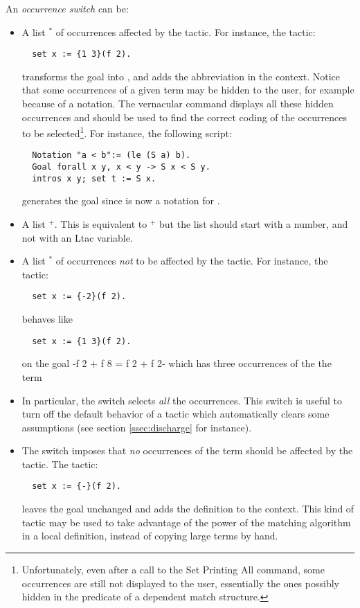 An \emph{occurrence switch} can be:
\begin{itemize}
\item A list \ssrC{\{} {\naturalnumber}$^*$ \ssrC{\}} of occurrences affected by the
  tactic.
For instance, the tactic:
\begin{lstlisting}
  set x := {1 3}(f 2).
\end{lstlisting}
transforms the goal  into
, and adds the abbreviation
 in the
context. Notice that some occurrences of a
given term may be hidden to the user, for example because of a
notation. The vernacular  command displays all
these hidden occurrences and should be used to find the correct
coding of the occurrences to be selected\footnote{Unfortunately,
even after a call to the Set Printing All command, some occurrences are
still not displayed to the user, essentially the ones possibly hidden
in the predicate of a dependent match structure.}. For instance, the
following script:
\begin{lstlisting}
  Notation "a < b":= (le (S a) b).
  Goal forall x y, x < y -> S x < S y.
  intros x y; set t := S x.
\end{lstlisting}
generates the goal
 since  is now a notation for
.
\item A list \ssrC{\{}{\naturalnumber}$^+$\ssrC{\}}. This is equivalent to
  \ssrC{\{} {\naturalnumber}$^+$ \ssrC{\}} but the list should start with a number, and
  not with an Ltac variable.
\item A list \ssrC{\{}{\naturalnumber}$^*$\ssrC{\}} of occurrences \emph{not} to be
  affected by the tactic. For instance, the tactic:
\begin{lstlisting}
  set x := {-2}(f 2).
\end{lstlisting}
behaves like
\begin{lstlisting}
  set x := {1 3}(f 2).
\end{lstlisting}
on the goal \ssrL-f 2 + f 8 = f 2 + f 2- which has three occurrences of
the the term 
\item In particular, the switch \ssrC{\{+\}} selects \emph{all} the
  occurrences. This switch is useful to turn
  off the default behavior of a tactic which automatically clears
  some assumptions (see section \ref{ssec:discharge} for instance).
\item The switch \ssrC{\{-\}} imposes that \emph{no} occurrences of the
  term should be affected by the tactic. The tactic:
\begin{lstlisting}
  set x := {-}(f 2).
\end{lstlisting}
leaves the goal unchanged and adds the definition  to the
context. This kind of tactic may be used to take advantage of the
power of the matching algorithm in a local definition, instead of
copying large terms by hand.
\end{itemize}


